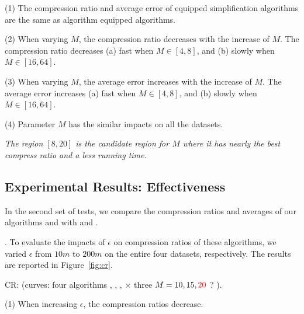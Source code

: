  
\ni(1) The compression ratio and average error of \rpia equipped simplification algorithms are the same as algorithm \cpia equipped algorithms.
 
\ni(2) When varying $M$, the compression ratio decreases with the increase of $M$.
The compression ratio decreases (a) fast when $M \in [4,8]$, and (b) slowly when $M \in [16, 64]$.


\ni(3) When varying $M$, the average error increases with the increase of $M$.
The average error increases (a) fast when $M \in [4,8]$, and (b) slowly when $M \in [16, 64]$.

\ni(4) Parameter $M$ has the similar impacts on all the datasets.

\emph{The region $[8, 20]$ is the candidate region for $M$ where it has nearly the best compress ratio and a less running time.}



\subsection{Experimental Results: Effectiveness}
In the second set of tests, we compare the compression ratios and averages of our algorithms \cist and \cista with \dpa and \squishe.


.
To evaluate the impacts of $\epsilon$ on compression ratios of these algorithms, we varied $\epsilon$ from $10m$ to $200m$ on
 the entire four datasets, respectively.
The results are reported in Figure~\ref{fig:cr}.

CR: (\textcolor[rgb]{0.00,0.07,1.00}{curves: four algorithms \cist, \cista, \dpa, \squishe  $\times$  three $M = 10, 15, \textcolor[rgb]{1.00,0.00,0.00}{20}$ ? }).

\ni (1) When increasing $\epsilon$, the compression ratios decrease.


